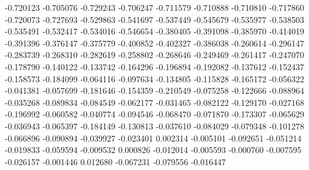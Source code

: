 -0.720123
-0.705076
-0.729243
-0.706247
-0.711579
-0.710888
-0.710810
-0.717860
-0.720073
-0.727693
-0.529863
-0.541697
-0.537449
-0.545679
-0.535977
-0.538503
-0.535491
-0.532417
-0.534016
-0.546654
-0.380405
-0.391098
-0.385970
-0.414019
-0.391396
-0.376147
-0.375779
-0.400852
-0.402327
-0.386038
-0.260614
-0.296147
-0.283739
-0.268310
-0.282619
-0.258802
-0.268646
-0.249469
-0.261417
-0.247070
-0.178790
-0.140122
-0.133742
-0.164296
-0.196894
-0.192082
-0.137612
-0.152437
-0.158573
-0.184099
-0.064116
-0.097634
-0.134805
-0.115828
-0.165172
-0.056322
-0.041381
-0.057699
-0.181646
-0.154359
-0.210549
-0.075258
-0.122666
-0.088964
-0.035268
-0.089834
-0.084549
-0.062177
-0.031465
-0.082122
-0.129170
-0.027168
-0.196992
-0.060582
-0.040774
-0.094546
-0.068470
-0.071870
-0.173307
-0.065629
-0.036943
-0.065397
-0.184149
-0.130813
-0.037610
-0.084029
-0.079348
-0.101278
-0.066896
-0.090894
-0.039927
-0.023401
0.002314
-0.005101
-0.092651
-0.051214
-0.019833
-0.059594
-0.009532
0.000826
-0.012014
-0.005593
-0.000760
-0.007595
-0.026157
-0.001446
0.012680
-0.067231
-0.079556
-0.016447
